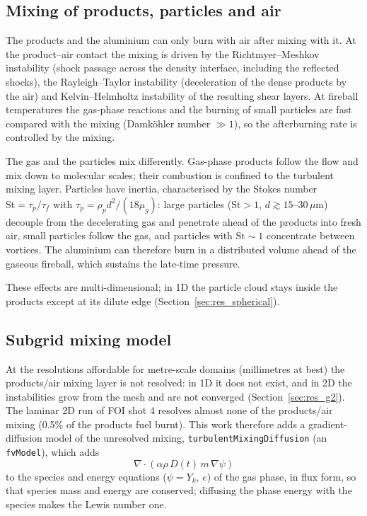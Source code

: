 \documentclass{article}
\begin{document}
\subsection{Mixing of products, particles and air}

The products and the aluminium can only burn with air after mixing with it. At the product--air contact the mixing is driven by the Richtmyer--Meshkov instability (shock passage across the density interface, including the reflected shocks), the Rayleigh--Taylor instability (deceleration of the dense products by the air) and Kelvin--Helmholtz instability of the resulting shear layers. At fireball temperatures the gas-phase reactions and the burning of small particles are fast compared with the mixing (Damk\"ohler number $\gg 1$), so the afterburning rate is controlled by the mixing.

The gas and the particles mix differently. Gas-phase products follow the flow and mix down to molecular scales; their combustion is confined to the turbulent mixing layer. Particles have inertia, characterised by the Stokes number $\text{St} = \tau_p/\tau_f$ with $\tau_p = \rho_p d^2/(18\mu_g)$: large particles ($\text{St} > 1$, $d \gtrsim 15$--$30\,\mu\text{m}$) decouple from the decelerating gas and penetrate ahead of the products into fresh air, small particles follow the gas, and particles with $\text{St} \sim 1$ concentrate between vortices. The aluminium can therefore burn in a distributed volume ahead of the gaseous fireball, which sustains the late-time pressure.

These effects are multi-dimensional; in 1D the particle cloud stays inside the products except at its dilute edge (Section~\ref{sec:res_spherical}).

\subsection{Subgrid mixing model}
\label{sec:mixing_model}

At the resolutions affordable for metre-scale domains (millimetres at best) the products/air mixing layer is not resolved: in 1D it does not exist, and in 2D the instabilities grow from the mesh and are not converged (Section~\ref{sec:res_g2}). The laminar 2D run of FOI shot 4 resolves almost none of the products/air mixing (0.5\% of the products fuel burnt). This work therefore adds a gradient-diffusion model of the unresolved mixing, \texttt{turbulentMixingDiffusion} (an \texttt{fvModel}), which adds
\begin{equation}
    \nabla\cdot\left(\alpha\rho\,D(t)\,m\,\nabla\psi\right)
    \label{eq:mixdiff}
\end{equation}
to the species and energy equations ($\psi = Y_k$, $e$) of the gas phase, in flux form, so that species mass and energy are conserved; diffusing the phase energy with the species makes the Lewis number one.
\end{document}
